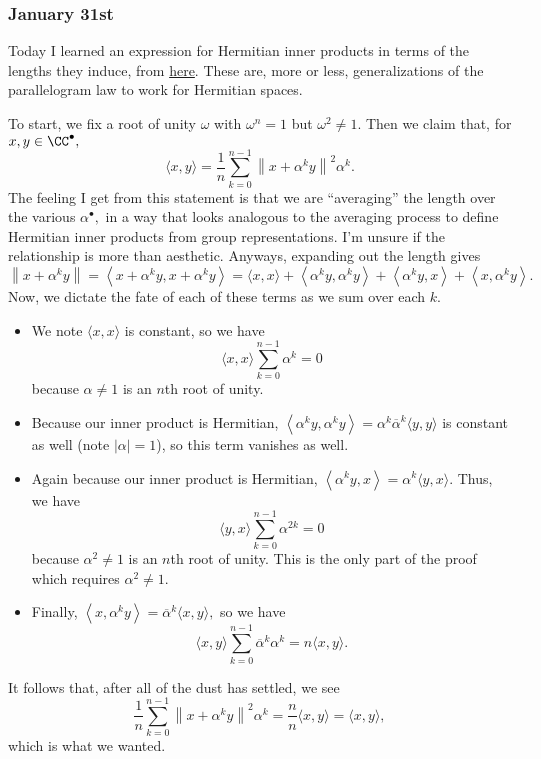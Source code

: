 \subsubsection{January 31st}
Today I learned an expression for Hermitian inner products in terms of the lengths they induce, from \href{http://estoyanov.net/files/MATAMATIKA/23982177-TheCauchy-Schwartz-Master-Class.pdf}{here}. These are, more or less, generalizations of the parallelogram law to work for Hermitian spaces.

To start, we fix a root of unity $\omega$ with $\omega^n=1$ but $\omega^2\ne1.$ Then we claim that, for $x,y\in\CC^\bullet,$
\[\langle x,y\rangle=\frac1n\sum_{k=0}^{n-1}\left\lVert x+\alpha^ky\right\rVert^2\alpha^k.\]
The feeling I get from this statement is that we are ``averaging'' the length over the various $\alpha^\bullet,$ in a way that looks analogous to the averaging process to define Hermitian inner products from group representations. I'm unsure if the relationship is more than aesthetic. Anyways, expanding out the length gives
\[\left\lVert x+\alpha^ky\right\rVert=\left\langle x+\alpha^ky,x+\alpha^k y\right\rangle=\langle x,x\rangle+\left\langle\alpha^ky,\alpha^ky\right\rangle+\left\langle\alpha^ky,x\right\rangle+\left\langle x,\alpha^ky\right\rangle.\]
Now, we dictate the fate of each of these terms as we sum over each $k.$
\begin{itemize}
    \item We note $\langle x,x\rangle$ is constant, so we have
    \[\langle x,x\rangle\sum_{k=0}^{n-1}\alpha^k=0\]
    because $\alpha\ne1$ is an $n$th root of unity.
    \item Because our inner product is Hermitian, $\left\langle\alpha^ky,\alpha^ky\right\rangle=\alpha^k\overline\alpha^k\langle y,y\rangle$ is constant as well (note $|\alpha|=1$), so this term vanishes as well.
    \item Again because our inner product is Hermitian, $\left\langle\alpha^ky,x\right\rangle=\alpha^k\langle y,x\rangle.$ Thus, we have
    \[\langle y,x\rangle\sum_{k=0}^{n-1}\alpha^{2k}=0\]
    because $\alpha^2\ne1$ is an $n$th root of unity. This is the only part of the proof which requires $\alpha^2\ne1.$
    \item Finally, $\left\langle x,\alpha^ky\right\rangle=\overline\alpha^k\langle x,y\rangle,$ so we have
    \[\langle x,y\rangle\sum_{k=0}^{n-1}\overline\alpha^k\alpha^k=n\langle x,y\rangle.\]
\end{itemize}
It follows that, after all of the dust has settled, we see
\[\frac1n\sum_{k=0}^{n-1}\left\lVert x+\alpha^ky\right\rVert^2\alpha^k=\frac nn\langle x,y\rangle=\langle x,y\rangle,\]
which is what we wanted.

